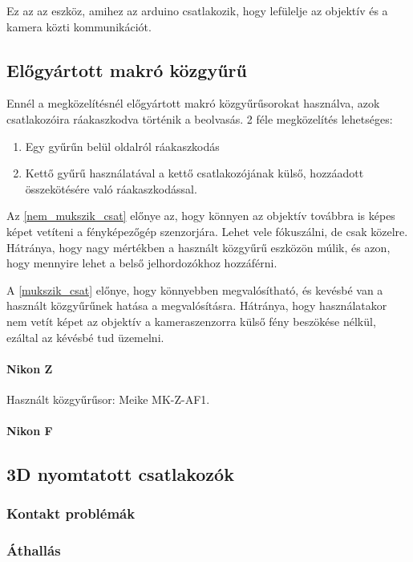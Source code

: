Ez az az eszköz, amihez az arduino csatlakozik, hogy lefülelje az objektív és a kamera közti kommunikációt.
\subsection{Előgyártott makró közgyűrű}
Ennél a megközelítésnél előgyártott makró közgyűrűsorokat használva, azok csatlakozóira ráakaszkodva történik a beolvasás.
2 féle megközelítés lehetséges:
\begin{enumerate}
    \item Egy gyűrűn belül oldalról ráakaszkodás \label{nem_mukszik_csat}
    \item Kettő gyűrű használatával a kettő csatlakozójának külső, hozzáadott összekötésére való ráakaszkodással.\label{mukszik_csat}
\end{enumerate}
Az \ref{nem_mukszik_csat} előnye az, hogy könnyen az objektív továbbra is képes képet vetíteni a fényképezőgép szenzorjára. Lehet vele fókuszálni, de csak közelre.
Hátránya, hogy nagy mértékben a használt közgyűrű eszközön múlik, és azon, hogy mennyire lehet a belső jelhordozókhoz hozzáférni.

A \ref{mukszik_csat} előnye, hogy könnyebben megvalósítható, és kevésbé van a használt közgyűrűnek hatása a megvalósításra.
Hátránya, hogy használatakor nem vetít képet az objektív a kameraszenzorra külső fény beszökése nélkül, ezáltal az kévésbé tud üzemelni.  
\paragraph{Nikon Z}
Használt közgyűrűsor: Meike MK-Z-AF1.

\paragraph{Nikon F}

\subsection{3D nyomtatott csatlakozók}
\subsubsection{Kontakt problémák}
\subsubsection{Áthallás}